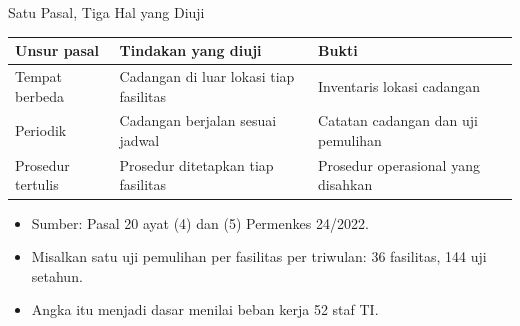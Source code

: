 \documentclass[aspectratio=169, table, 12pt]{beamer}
\begin{document}
\begin{frame}{{\Large Satu Pasal, Tiga Hal yang Diuji}}
  \vspace{2pt}
  \footnotesize
  \begin{tabularx}{\textwidth}{|>{\raggedright\arraybackslash}p{}|>{\raggedright\arraybackslash}X|>{\raggedright\arraybackslash}X|}
    \hline
    \textbf{Unsur pasal} & \textbf{Tindakan yang diuji} & \textbf{Bukti} \\ \hline
    Tempat berbeda & Cadangan di luar lokasi tiap fasilitas & Inventaris lokasi cadangan \\ \hline
    Periodik & Cadangan berjalan sesuai jadwal & Catatan cadangan dan uji pemulihan \\ \hline
    Prosedur tertulis & Prosedur ditetapkan tiap fasilitas & Prosedur operasional yang disahkan \\ \hline
  \end{tabularx}

  \vspace{8pt}
  \small
  \begin{itemize}
    \item Sumber: Pasal 20 ayat (4) dan (5) Permenkes 24/2022.
    \item Misalkan satu uji pemulihan per fasilitas per triwulan: 36 fasilitas, 144 uji setahun.
    \item Angka itu menjadi dasar menilai beban kerja 52 staf TI.
  \end{itemize}
\end{frame}
\end{document}
